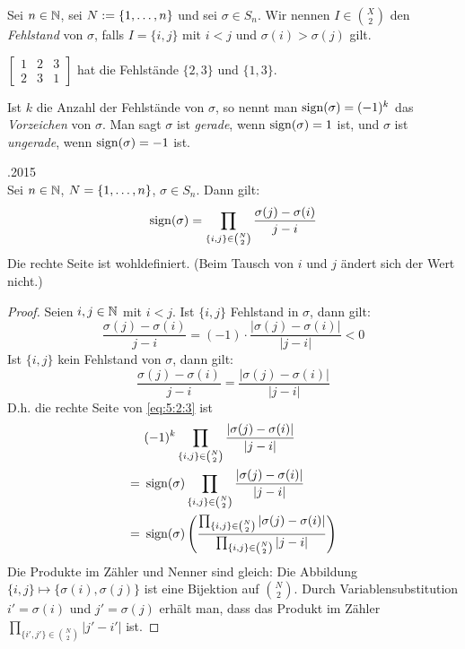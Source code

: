 Sei $ n \in \mathbb N $, sei $ N := \{ 1,\ldots,n \} $ und sei $ \sigma \in S_n $. Wir nennen $ I \in \binom{X}{2} $ den \emph{Fehlstand} von $ \sigma $, falls $ I = \{i,j\} $ mit $ i<j $ und $ \sigma(i)>\sigma(j) $ gilt.

\begin{bsp}
	$
	\begin{bmatrix}
		1 & 2 & 3 \\
		2 & 3 & 1
	\end{bmatrix}
	$
	hat die Fehlstände $ \{2,3\} $ und $ \{1,3\} $.
\end{bsp}

\noindent Ist $ k $ die Anzahl der Fehlstände von $ \sigma $, so nennt man $ \operatorname{sign}(\sigma) = (-1)^k $ das \emph{Vorzeichen} von $ \sigma $. Man sagt $ \sigma $ ist \emph{gerade}, wenn $ \operatorname{sign}(\sigma) = 1 $ ist, und $ \sigma $ ist \emph{ungerade}, wenn $ \operatorname{sign}(\sigma) = -1 $ ist.

\begin{propn}\hfill {.2015}\\
	Sei $ n \in \mathbb N $, $ N = \{ 1,\ldots,n \} $, $ \sigma \in S_n $. Dann gilt:
	\begin{equation}
		\operatorname{sign}(\sigma) = \prod_{\{i,j\} \in \binom{N}{2}} \frac{\sigma(j) - \sigma(i)}{j-i}
		\label{eq:5:2:3}
	\end{equation}
	Die rechte Seite ist wohldefiniert. (Beim Tausch von $ i $ und $ j $ ändert sich der Wert nicht.)
\end{propn}
\begin{proof}
	Seien $ i,j \in \mathbb N $ mit $ i < j $. Ist $ \{ i,j \} $ Fehlstand in $ \sigma $, dann gilt:
	\begin{equation*}
		\frac{\sigma(j) - \sigma(i)}{j-i} = (-1)\cdot\frac{|\sigma(j) - \sigma(i)|}{|j-i|} < 0
	\end{equation*}
	Ist $ \{ i,j \} $ kein Fehlstand von $ \sigma $, dann gilt:
	\begin{equation*}
		\frac{\sigma(j) - \sigma(i)}{j-i} = \frac{|\sigma(j) - \sigma(i)|}{|j-i|}
	\end{equation*}
	D.h. die rechte Seite von \eqref{eq:5:2:3} ist
	\begin{align*}
		&\ (-1)^k \prod_{\{ i,j \} \in \binom{N}{2}} \frac{|\sigma(j)-\sigma(i)|}{|j-i|} \\
		=&\ \operatorname{sign}(\sigma) \prod_{\{ i,j \} \in \binom{N}{2}} \frac{|\sigma(j)-\sigma(i)|}{|j-i|} \\
		=&\ \operatorname{sign}(\sigma) \left( \frac{\prod_{\{ i,j \} \in \binom{N}{2}} |\sigma(j) - \sigma(i)|}{\prod_{\{ i,j \} \in \binom{N}{2}} |j-i|} \right)
	\end{align*}
	Die Produkte im Zähler und Nenner sind gleich: Die Abbildung $ \{ i,j \} \mapsto \{ \sigma(i),\sigma(j) \} $ ist eine Bijektion auf $ \binom{N}{2} $. Durch Variablensubstitution $ i' = \sigma(i) $ und $ j' = \sigma(j) $ erhält man, dass das Produkt im Zähler $ \prod_{\{ i',j' \} \in \binom{N}{2}} |j'-i'| $ ist.
\end{proof}


